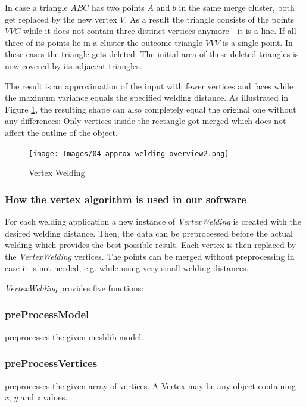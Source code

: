 \documentclass[../ClassicThesis.tex]{subfiles}
\begin{document}
In case a triangle $ABC$ has two points $A$ and $b$ in the same merge cluster, both get replaced by the new vertex $V$. As a result the triangle consists of the points $VVC$ while it does not contain three distinct vertices anymore - it is a line. If all three of its points lie in a cluster the outcome triangle $VVV$ is a single point. In these cases the triangle gets deleted. The initial area of these deleted triangles is now covered by its adjacent triangles.

The result is an approximation of the input with fewer vertices and faces while the maximum variance equals the specified welding distance. As illustrated in Figure \ref{fig:vertex_welding}, the resulting shape can also completely equal the original one without any differences: Only vertices inside the rectangle got merged which does not affect the outline of the object.



\begin{figure}
\texttt{[image: Images/04-approx-welding-overview2.png]}
\caption{Vertex Welding}
\label{fig:vertex_welding}
\end{figure}

\subsubsection{How the vertex algorithm is used in our software}

For each welding application a new instance of \emph{VertexWelding} is created with the desired welding distance. Then, the data can be preprocessed before the actual welding which provides the best possible result. Each vertex is then replaced by the \emph{VertexWelding} vertices. The points can be merged without preprocessing in case it is not needed, e.g. while using very small welding distances.

\emph{VertexWelding} provides five functions:

\subsubsection*{preProcessModel}

preprocesses the given meshlib model.

\subsubsection*{preProcessVertices}

preprocesses the given array of vertices. A Vertex may be any object containing \emph{x}, \emph{y} and \emph{z} values.
\end{document}
